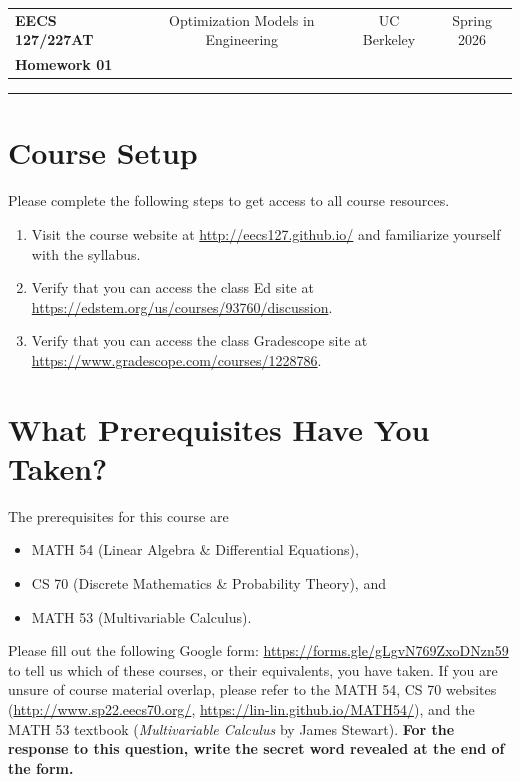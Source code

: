\documentclass[10pt]{article}
\theoremstyle{definition}
\theoremstyle{plain}
\begin{document}
\begin{center}
\begin{tabular}{lccc}
\textbf{EECS 127/227AT} & Optimization Models in Engineering & UC Berkeley & Spring 2026 \\
\textbf{Homework 01} & & &
\end{tabular}
\end{center}
\noindent\rule{\textwidth}{2pt}

\vspace{1em}

\section{Course Setup}

Please complete the following steps to get access to all course resources.

\begin{enumerate}[label=(\alph*)]
    \item Visit the course website at \url{http://eecs127.github.io/} and familiarize yourself with the syllabus.
    \item Verify that you can access the class Ed site at \url{https://edstem.org/us/courses/93760/discussion}.
    \item Verify that you can access the class Gradescope site at \url{https://www.gradescope.com/courses/1228786}.
\end{enumerate}

\newpage

\section{What Prerequisites Have You Taken?}

The prerequisites for this course are
\begin{itemize}
    \item MATH 54 (Linear Algebra \& Differential Equations),
    \item CS 70 (Discrete Mathematics \& Probability Theory), and
    \item MATH 53 (Multivariable Calculus).
\end{itemize}

Please fill out the following Google form: \url{https://forms.gle/gLgvN769ZxoDNzn59} to tell us which of these courses, or their equivalents, you have taken. If you are unsure of course material overlap, please refer to the MATH 54, CS 70 websites (\url{http://www.sp22.eecs70.org/}, \url{https://lin-lin.github.io/MATH54/}), and the MATH 53 textbook (\textit{Multivariable Calculus} by James Stewart). \textbf{For the response to this question, write the secret word revealed at the end of the form.}
\end{document}
